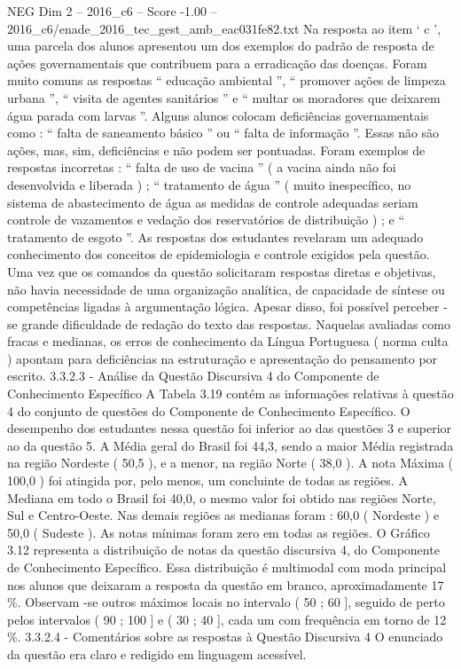 \begin{textsample}{NEG Dim 2 – 2016\_c6 – Score -1.00 – 2016\_c6/enade\_2016\_tec\_gest\_amb\_eac031fe82.txt}
Na resposta ao item ‘ c ’, uma parcela dos alunos apresentou um dos exemplos do padrão de resposta de ações governamentais que contribuem para a erradicação das doenças.
Foram muito comuns as respostas “ educação ambiental ”, “ promover ações de limpeza urbana ”, “ visita de agentes sanitários ” e “ multar os moradores que deixarem água parada com larvas ”.
Alguns alunos colocam deficiências governamentais como : “ falta de saneamento básico ” ou “ falta de informação ”.
Essas não são ações, mas, sim, deficiências e não podem ser pontuadas.
Foram exemplos de respostas incorretas : “ falta de uso de vacina ” ( a vacina ainda não foi desenvolvida e liberada ) ; “ tratamento de água ” ( muito inespecífico, no sistema de abastecimento de água as medidas de controle adequadas seriam controle de vazamentos e vedação dos reservatórios de distribuição ) ; e “ tratamento de esgoto ”.
As respostas dos estudantes revelaram um adequado conhecimento dos conceitos de epidemiologia e controle exigidos pela questão.
Uma vez que os comandos da questão solicitaram respostas diretas e objetivas, não havia necessidade de uma organização analítica, de capacidade de síntese ou competências ligadas à argumentação lógica.
Apesar disso, foi possível perceber -se grande dificuldade de redação do texto das respostas.
Naquelas avaliadas como fracas e medianas, os erros de conhecimento da Língua Portuguesa ( norma culta ) apontam para deficiências na estruturação e apresentação do pensamento por escrito. 3.3.2.3 - Análise da Questão Discursiva 4 do Componente de Conhecimento Específico A Tabela 3.19 contém as informações relativas à questão 4 do conjunto de questões do Componente de Conhecimento Específico.
O desempenho dos estudantes nessa questão foi inferior ao das questões 3 e superior ao da questão 5.
A Média geral do Brasil foi 44,3, sendo a maior Média registrada na região Nordeste ( 50,5 ), e a menor, na região Norte ( 38,0 ).
A nota Máxima ( 100,0 ) foi atingida por, pelo menos, um concluinte de todas as regiões.
A Mediana em todo o Brasil foi 40,0, o mesmo valor foi obtido nas regiões Norte, Sul e Centro-Oeste.
Nas demais regiões as medianas foram : 60,0 ( Nordeste ) e 50,0 ( Sudeste ).
As notas mínimas foram zero em todas as regiões.
O Gráfico 3.12 representa a distribuição de notas da questão discursiva 4, do Componente de Conhecimento Específico.
Essa distribuição é multimodal com moda principal nos alunos que deixaram a resposta da questão em branco, aproximadamente 17 \%.
Observam -se outros máximos locais no intervalo ( 50 ; 60 ], seguido de perto pelos intervalos ( 90 ; 100 ] e ( 30 ; 40 ], cada um com frequência em torno de 12 \%. 3.3.2.4 - Comentários sobre as respostas à Questão Discursiva 4 O enunciado da questão era claro e redigido em linguagem acessível.

\end{textsample}
